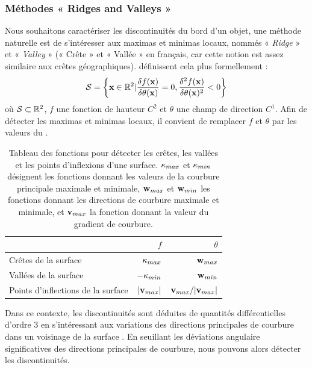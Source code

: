 \subsubsection{Méthodes « Ridges and Valleys »}%
\label{sec:applications:feature:ridge}
%
Nous souhaitons caractériser les discontinuités du bord d'un objet, une méthode
naturelle est de s'intéresser aux maximas et minimas locaux, nommés \respp «
\emph{Ridge} » et « \emph{Valley} » (« Crête » et « Vallée » en français, car
cette notion est assez similaire aux crêtes géographiques).
%
 définissent cela plus formellement :
%
\begin{equation}
  \mathcal{S} = \left\{ \mathbf{x} \in \mathbb{R}^2 |
  \frac{\delta f(\mathbf{x})}{\delta \theta(\mathbf{x})} = 0,
  \frac{\delta^2 f(\mathbf{x})}{\delta \theta(\mathbf{x})^2} < 0 \right\}
\end{equation}
%
où $\mathcal{S} \subset \mathbb{R}^2$, $f$ une fonction de hauteur $C^2$ et $\theta$ une
champ de direction $C^1$. Afin de détecter les maximas et minimas locaux, il
convient de remplacer $f$ et $\theta$ par les valeurs du
.
%
\begin{table}[h]
  \begin{center}
    \caption[Tableau des fonctions pour détecter les crêtes, les vallées et les
    points d’inflexions d'une surface.]{Tableau des fonctions pour détecter les
    crêtes, les vallées et les points d’inflexions d'une surface.
    $\kappa_{max}$ et $\kappa_{min}$ désignent les fonctions donnant les
    valeurs de la courbure principale maximale et minimale, $\mathbf{w}_{max}$ et
    $\mathbf{w}_{min}$ les fonctions donnant les directions de courbure maximale
    et minimale, et $\mathbf{v}_{max}$ la fonction donnant la valeur du gradient de
    courbure.}
    \label{tab:ridges-valleys-fonctions}
    \begin{tabular}{@{}lrr@{}}
      \toprule
                                          & $f$                 & $\theta$                \\ \midrule
      Crêtes de la surface                & $\kappa_{max}$   & $\mathbf{w}_{max}$        \\
      Vallées de la surface               & $-\kappa_{min}$  & $\mathbf{w}_{min}$        \\
      Points d'inflections de la surface  & $|\mathbf{v}_{max}|$       & $\mathbf{v}_{max}/|\mathbf{v}_{max}|$ \\ \bottomrule
    \end{tabular}
  \end{center}
\end{table}
%
Dans ce contexte, les discontinuités sont déduites de quantités différentielles
d'ordre $3$ en s'intéressant aux variations des directions principales de
courbure dans un voisinage de la surface \cite{Lai2007,Yang2006}. En seuillant
les déviations angulaire significatives des directions principales de courbure,
nous pouvons alors détecter les discontinuités.

